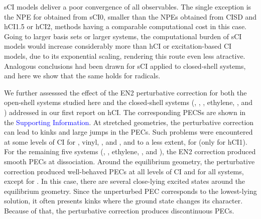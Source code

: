 \documentclass[aip,jcp,reprint,noshowkeys,superscriptaddress]{revtex4-1}
\newcommand{\SupInf}{\textcolor{blue}{Supporting Information}}
\begin{document}
sCI models deliver a poor convergence of all observables.
The single exception is the NPE for  obtained from sCI0, smaller than the NPEs obtained from CISD and hCI1.5 or hCI2, methods having a comparable computational cost in this case.
Going to larger basis sets or larger systems, the computational burden of sCI models would increase considerably more than hCI or excitation-based CI models, 
due to its exponential scaling, rendering this route even less atractive.
Analogous conclusions had been drawn for sCI applied to closed-shell systems, \cite{Kossoski_2022}
and here we show that the same holds for radicals.


We further assesssed the effect of the EN2 perturbative correction for both the open-shell systems studied here 
and the closed-shell systems (, , , ethylene, , and ) addressed in our first report on hCI. \cite{Kossoski_2022}
The corresponding PECSs are shown in the {\SupInf}.
At stretched geometries, the perturbative correction can lead to kinks and large jumps in the PECs.
Such problems were encountered at some levels of CI for , vinyl, , and , and to a less extent, for  (only for hCI1).
For the remaining five systems (, , ethylene, , and ),
the EN2 correction produced smooth PECs at dissociation.
Around the equilibrium geometry, the perturbative correction produced well-behaved PECs at all levels of CI and for all systems, 
except for .
In this case, there are several close-lying excited states around the equilibrium geometry. \cite{}
Since the unperturbed PEC corresponds to the lowest-lying solution, it often presents kinks where the ground state changes its character.
Because of that, the perturbative correction produces discontinuous PECs.
\end{document}

